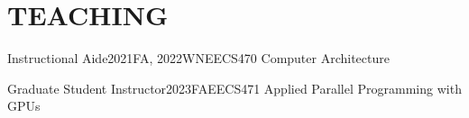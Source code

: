 \section{TEACHING}
    \resumeSubHeadingListStart
        \resumeSubheading
        {Instructional Aide}{2021FA, 2022WN}{EECS470 Computer Architecture}{}
        \resumeItemListStart
        \resumeItemListEnd
        
        \resumeSubheading
        {Graduate Student Instructor}{2023FA}{EECS471 Applied Parallel Programming with GPUs}{}
        \resumeItemListStart
        \resumeItemListEnd
            
    \resumeSubHeadingListEnd
